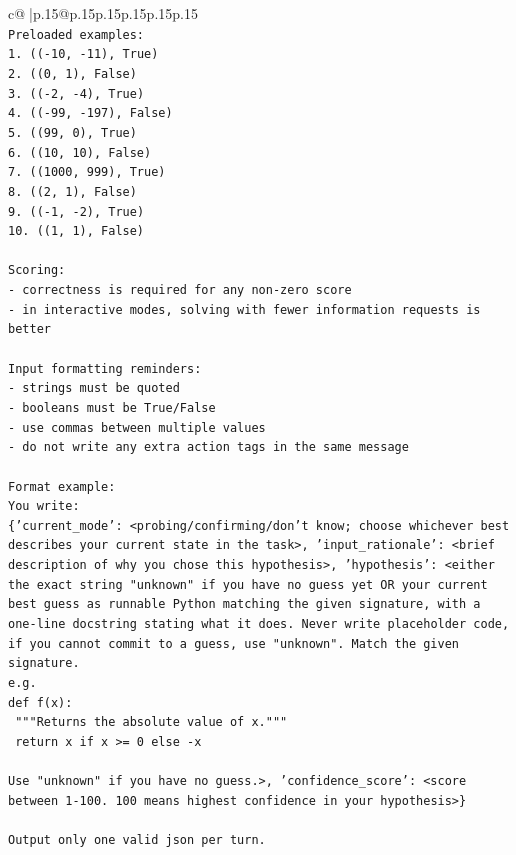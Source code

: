 \documentclass{article}
\begin{document}
{\begin{supertabular}{c@{$\;$}|p{.15\linewidth}@{}p{.15\linewidth}p{.15\linewidth}p{.15\linewidth}p{.15\linewidth}p{.15\linewidth}}
{{{\\ 
\texttt{Preloaded examples:} \\
\texttt{1. (({-}10, {-}11), True)} \\
\texttt{2. ((0, 1), False)} \\
\texttt{3. (({-}2, {-}4), True)} \\
\texttt{4. (({-}99, {-}197), False)} \\
\texttt{5. ((99, 0), True)} \\
\texttt{6. ((10, 10), False)} \\
\texttt{7. ((1000, 999), True)} \\
\texttt{8. ((2, 1), False)} \\
\texttt{9. (({-}1, {-}2), True)} \\
\texttt{10. ((1, 1), False)} \\
\\ 
\texttt{Scoring:} \\
\texttt{{-} correctness is required for any non{-}zero score} \\
\texttt{{-} in interactive modes, solving with fewer information requests is better} \\
\\ 
\texttt{Input formatting reminders:} \\
\texttt{{-} strings must be quoted} \\
\texttt{{-} booleans must be True/False} \\
\texttt{{-} use commas between multiple values} \\
\texttt{{-} do not write any extra action tags in the same message} \\
\\ 
\texttt{Format example:} \\
\texttt{You write:} \\
\texttt{\{'current\_mode': <probing/confirming/don't know; choose whichever best describes your current state in the task>, 'input\_rationale': <brief description of why you chose this hypothesis>, 'hypothesis': <either the exact string "unknown" if you have no guess yet OR your current best guess as runnable Python matching the given signature, with a one{-}line docstring stating what it does. Never write placeholder code, if you cannot commit to a guess, use "unknown". Match the given signature.} \\
\texttt{e.g.} \\
\texttt{def f(x):} \\
\texttt{	"""Returns the absolute value of x."""} \\
\texttt{	return x if x >= 0 else {-}x} \\
\\ 
\texttt{Use "unknown" if you have no guess.>, 'confidence\_score': <score between 1{-}100. 100 means highest confidence in your hypothesis>\}} \\
\\ 
\texttt{Output only one valid json per turn.} \\
            }
        }
    }
     \\ \\


\end{supertabular}}
\end{document}
